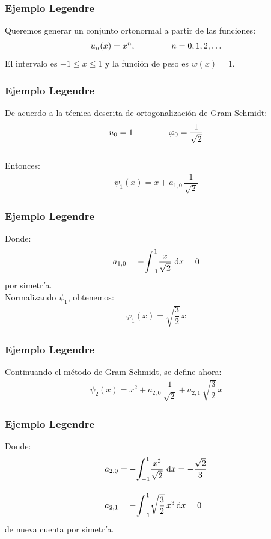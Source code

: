 \documentclass[12pt]{beamer}
\begin{document}
\begin{frame}
\frametitle{Ejemplo Legendre}
Queremos generar un conjunto ortonormal a partir de las funciones:
\pause
\begin{align*}
u_{n}(x) = x^{n}, \hspace{1.5cm} n = 0, 1, 2, \ldots
\end{align*}
El intervalo es $-1 \leq x \leq 1$ y la función de peso es $w(x)=1$.
\end{frame}
\begin{frame}
\frametitle{Ejemplo Legendre}
De acuerdo a la técnica descrita de ortogonalización de Gram-Schmidt:
\pause
\begin{align}
u_{0} = 1 \hspace{1.5cm} \varphi_{0} =  \dfrac{1}{\sqrt{2}}
\label{eq:ecuacion_10_50}
\end{align}
\\
\bigskip
\pause
Entonces:
\pause
\begin{align}
\psi_{1}(x) = x + a_{1,0} \, \dfrac{1}{\sqrt{2}}
\label{eq:ecuacion_10_51}
\end{align}
\end{frame}
\begin{frame}
\frametitle{Ejemplo Legendre}
Donde:
\pause
\begin{align}
a_{1, 0} = - \scaleint{6ex}_{\bs -1}^{1} \dfrac{x}{\sqrt{2}} \, \dd{x} = 0
\label{eq:ecuacion_10_52}
\end{align}
por simetría.
\\
\bigskip
\pause
Normalizando $\psi_{1}$, obtenemos:
\pause
\begin{align}
\varphi_{1}(x) = \sqrt{\dfrac{3}{2}} \, x
\label{eq:ecuacion_10_53}
\end{align}
\end{frame}
\begin{frame}
\frametitle{Ejemplo Legendre}
Continuando el método de Gram-Schmidt, se define ahora:
\pause
\begin{align}
\psi_{2} (x) = x^{2} +  a_{2, 0} \, \dfrac{1}{\sqrt{2}} +  a_{2, 1} \, \sqrt{\dfrac{3}{2}} \, x
\label{eq:ecuacion_10_54}
\end{align}
\end{frame}
\begin{frame}
\frametitle{Ejemplo Legendre}
Donde:
\begin{align}
a_{2, 0} &= - \scaleint{6ex}_{\bs -1}^{1} \dfrac{x^{2}}{\sqrt{2}} \, \dd{x} = - \dfrac{\sqrt{2}}{3} \label{eq:ecuacion_10_55} \\[1em] 
a_{2, 1} &= - \scaleint{6ex}_{\bs -1}^{1} \sqrt{\dfrac{3}{2}} \, x^{3} \dd{x} = 0 \label{eq:ecuacion_10_56}
\end{align}
de nueva cuenta por simetría.
\end{frame}
\end{document}
